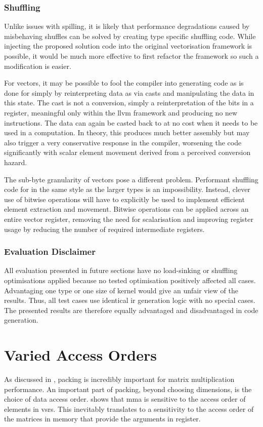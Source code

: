 \documentclass[\main/thesis.tex]{subfiles}
\begin{document}
\subsubsection{Shuffling}
Unlike issues with spilling, it is likely that performance degradations caused by misbehaving shuffles can be solved by creating type specific shuffling code.
While injecting the proposed solution code into the original vectorisation framework is possible, it would be much more effective to first refactor the framework so such a modification is easier.

For  vectors, it may be possible to fool the compiler into generating code as is done for  simply by reinterpreting data as  via casts and manipulating the data in this state.
The cast is not a conversion, simply a reinterpretation of the bits in a register, meaningful only within the \gls{llvm} framework and producing no new instructions.
The data can again be casted back to  at no cost when it needs to be used in a computation.
In theory, this produces much better assembly but may also trigger a very conservative response in the compiler, worsening the code significantly with scalar element movement derived from a perceived conversion hazard.

The sub-byte granularity of  vectors pose a different problem.
Performant shuffling code for  in the same style as the larger types is an impossibility.
Instead, clever use of bitwise operations will have to explicitly be used to implement efficient element extraction and movement.
Bitwise operations can be applied across an entire vector register, removing the need for scalarisation and improving register usage by reducing the number of required intermediate registers.

\subsubsection{Evaluation Disclaimer}
All evaluation presented in future sections have no load-sinking or shuffling optimisations applied because no tested optimisation positively affected all cases.
Advantaging one type or one size of kernel would give an unfair view of the results.
Thus, all test cases use identical \gls{ir} generation logic with no special cases.
The presented results are therefore equally advantaged and disadvantaged in code generation.

\section{Varied Access Orders}
\label{sec:variedOrders}
As discussed in , packing is incredibly important for matrix multiplication performance.
An important part of packing, beyond choosing dimensions, is the choice of data access order.
 shows that \gls{mma} is sensitive to the access order of elements in \glspl{vsr}.
This inevitably translates to a sensitivity to the access order of the matrices in memory that provide the arguments in register.
\end{document}

